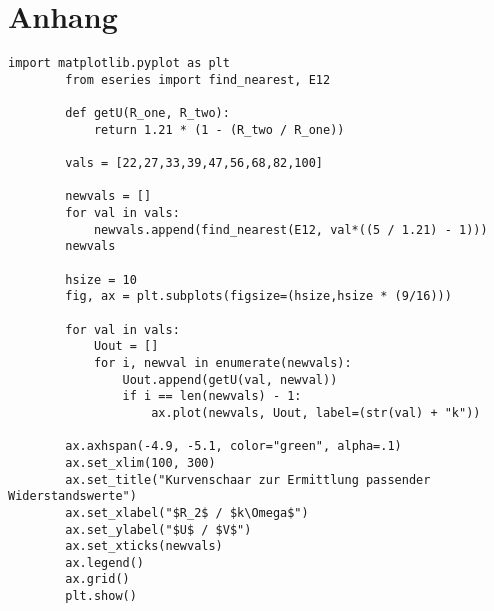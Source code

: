 \chapter{Anhang}
	\begin{lstlisting}[style=python, caption={Python-Code zur Darstellung der Spannungswerte am Ausgang des \textit{LT1054} bei verschiedenen Kombinationen für die
		Widerstandswerte \(R_1, R_2\).}]
		import matplotlib.pyplot as plt
		from eseries import find_nearest, E12

		def getU(R_one, R_two):
			return 1.21 * (1 - (R_two / R_one))

		vals = [22,27,33,39,47,56,68,82,100]

		newvals = []
		for val in vals:
			newvals.append(find_nearest(E12, val*((5 / 1.21) - 1)))
		newvals

		hsize = 10
		fig, ax = plt.subplots(figsize=(hsize,hsize * (9/16)))

		for val in vals:
			Uout = []
			for i, newval in enumerate(newvals):
				Uout.append(getU(val, newval))
				if i == len(newvals) - 1:
					ax.plot(newvals, Uout, label=(str(val) + "k"))

		ax.axhspan(-4.9, -5.1, color="green", alpha=.1)
		ax.set_xlim(100, 300)
		ax.set_title("Kurvenschaar zur Ermittlung passender Widerstandswerte")
		ax.set_xlabel("$R_2$ / $k\Omega$")
		ax.set_ylabel("$U$ / $V$")
		ax.set_xticks(newvals)
		ax.legend()
		ax.grid()
		plt.show()
	\end{lstlisting}
	\label{lst:python code}
